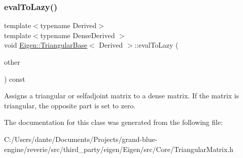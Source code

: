 \subsubsection{\texorpdfstring{evalToLazy()}{evalToLazy()}}
{\footnotesize\ttfamily template$<$typename Derived$>$ \\
template$<$typename Dense\+Derived $>$ \\
void \mbox{\hyperlink{class_eigen_1_1_triangular_base}{Eigen\+::\+Triangular\+Base}}$<$ Derived $>$\+::eval\+To\+Lazy (\begin{DoxyParamCaption}\item[{\mbox{\hyperlink{class_eigen_1_1_matrix_base}{Matrix\+Base}}$<$ Dense\+Derived $>$ \&}]{other }\end{DoxyParamCaption}) const}

Assigns a triangular or selfadjoint matrix to a dense matrix. If the matrix is triangular, the opposite part is set to zero. 

The documentation for this class was generated from the following file\+:\begin{DoxyCompactItemize}
\item 
C\+:/\+Users/dante/\+Documents/\+Projects/grand-\/blue-\/engine/reverie/src/third\+\_\+party/eigen/\+Eigen/src/\+Core/Triangular\+Matrix.\+h\end{DoxyCompactItemize}
